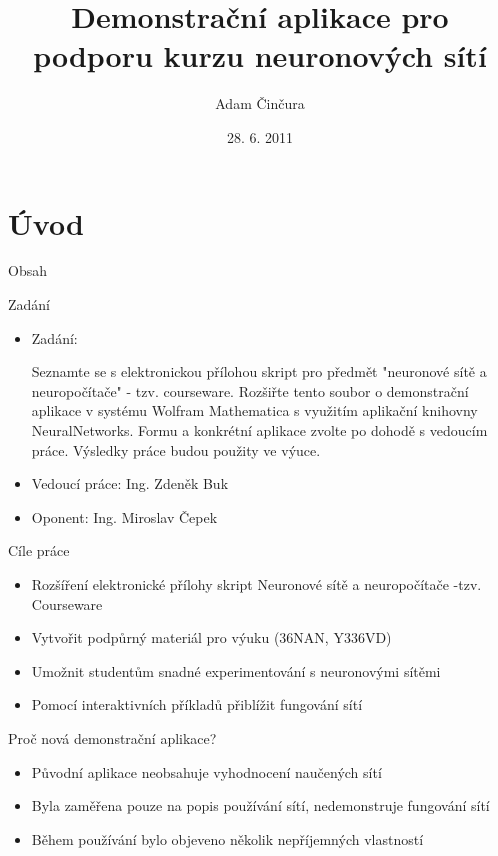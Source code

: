 \documentclass{beamer}
\title[Demonstrační aplikace pro podporu kurzu neuronových sítí]{Demonstrační aplikace pro podporu kurzu neuronových sítí}
\author{Adam Činčura}
\institute{ČVUT - FEL}
\date{28. 6. 2011}
\begin{document}
\begin{frame}
\titlepage
\end{frame}
\section{Úvod}
\begin{frame}{Obsah}
   \tableofcontents
\end{frame}
\begin{frame}{Zadání}

\begin{itemize}
\item Zadání:

Seznamte se s elektronickou přílohou skript pro předmět "neuronové sítě a neuropočítače" - tzv. courseware. Rozšiřte tento soubor o demonstrační aplikace v systému Wolfram Mathematica s využitím aplikační knihovny NeuralNetworks. Formu a konkrétní aplikace zvolte po dohodě s vedoucím práce. Výsledky práce budou použity ve výuce.


\item Vedoucí práce: Ing. Zdeněk Buk
\item Oponent: Ing. Miroslav Čepek
\end{itemize}
\end{frame}

\begin{frame}{Cíle práce}
\begin{itemize}
\item Rozšíření elektronické přílohy skript Neuronové sítě a neuropočítače -tzv. Courseware
\item Vytvořit podpůrný materiál pro výuku (36NAN, Y336VD)
\item Umožnit studentům snadné experimentování s neuronovými sítěmi
\item Pomocí interaktivních příkladů přiblížit fungování sítí
\end{itemize}
\end{frame}

\begin{frame}{Proč nová demonstrační aplikace?}
\begin{itemize}
\item Původní aplikace neobsahuje vyhodnocení naučených sítí
\item Byla zaměřena pouze na popis používání sítí, nedemonstruje fungování sítí
\item Během používání bylo objeveno několik nepříjemných vlastností
\end{itemize}
\end{frame}
\end{document}
